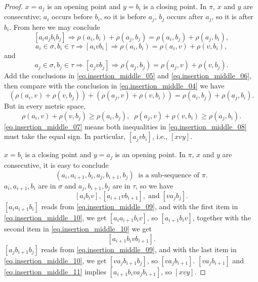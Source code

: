 \documentclass[12pt]{article}
\begin{document}
\begin{proof}
 $x=a_j$ is an opening point and $y=b_i$
is a closing point. 
In $\pi$, $x$ and $y$ are consecutive;
$a_i$ occurs before $b_i$, so it is before $a_j$,
$b_j$ occurs after $a_j$, so it is after $b_i$.
From here we may conclude
\begin{equation}\label{eq.insertion_middle_04}
[a_i a_j b_i b_j] \Rightarrow
\rho(a_i, b_i)+\rho(a_j, b_j) = \rho(a_i, b_j)+\rho(a_j, b_i),
\end{equation}
\begin{equation}\label{eq.insertion_middle_05}
a_i \in \sigma, b_i \in \tau \Rightarrow 
[a_ivb_i] \Rightarrow \rho(a_i, b_i) = \rho(a_i, v) + \rho(v, b_i),
\end{equation}
and 
\begin{equation}\label{eq.insertion_middle_06}
a_j \in \sigma, b_j \in \tau \Rightarrow 
[a_jvb_j] \Rightarrow \rho(a_j, b_j) = \rho(a_j, v) + \rho(v, b_j).
\end{equation}
Add the conclusions in \eqref{eq.insertion_middle_05} and \eqref{eq.insertion_middle_06},
then compare with the conclusion in \eqref{eq.insertion_middle_04}
we have
\begin{equation}\label{eq.insertion_middle_07}
(\rho(a_i, v) + \rho(v, b_j))+(\rho(a_j, v) + \rho(v, b_i)) = \rho(a_i, b_j) + \rho(a_j, b_i).
\end{equation}
But in every metric space, 
\begin{equation}\label{eq.insertion_middle_08}
\rho(a_i, v) + \rho(v, b_j) \ge \rho(a_i, b_j), \;\;
\rho(a_j, v) + \rho(v, b_i) \ge \rho(a_j, b_i).
\end{equation}
\eqref{eq.insertion_middle_07} means both inequalities in
\eqref{eq.insertion_middle_08} must take the equal sign.
In particular, $[a_j v b_i]$, i.e., $[xvy]$.

 $x=b_i$ is a closing point and $y=a_j$
is an opening point.
In $\pi$, $x$ and $y$ are consecutive, it is easy to conclude
\begin{equation}\label{eq.insertion_middle_09}
(a_i, a_{i+1}, b_i, a_j, b_{i+1}, b_j) \;\; \mbox{is a sub-sequence of $\pi$}.
\end{equation}
$a_i, a_{i+1}, b_i$ are in $\sigma$ and $a_j, b_{i+1}, b_j$ are in $\tau$,
so we have
\begin{equation}\label{eq.insertion_middle_10}
[a_i b_i v], [a_{i+1} v b_{i+1}], \; \mbox{and} \; [va_j b_j].
\end{equation}
$[a_i a_{i+1} b_i]$ reads from \eqref{eq.insertion_middle_09},
and with the first item in \eqref{eq.insertion_middle_10},
we get $[a_ia_{i+1}b_iv]$, so $[a_{i+1}b_iv]$,
together with the second item in \eqref{eq.insertion_middle_10}
we get
\begin{equation}\label{eq.insertion_middle_11}
[a_{i+1}b_ivb_{i+1}].
\end{equation}
$[a_jb_{i+1}b_j]$ reads from \eqref{eq.insertion_middle_09},
and with the last item in \eqref{eq.insertion_middle_10},
we get $[va_jb_{i+1}b_j]$, so $[va_jb_{i+1}]$.
$[va_jb_{i+1}]$ and \eqref{eq.insertion_middle_11}
implies $[a_{i+1}b_iva_jb_{i+1}]$,
so $[xvy]$.
\end{proof}
\end{document}
